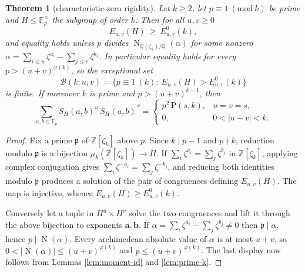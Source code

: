\documentclass[11pt,reqno]{amsart}
\newtheorem{theorem}{Theorem}[section]
\theoremstyle{definition}
\DeclareMathOperator{\Nm}{N}
\newcommand{\FF}{\mathbb{F}}
\newcommand{\ZZ}{\mathbb{Z}}
\newcommand{\QQ}{\mathbb{Q}}
\begin{document}
\begin{theorem}[characteristic-zero rigidity]\label{thm:B}
Let $k\ge2$, let $p\equiv1\ (\mathrm{mod}\ k)$ be prime and $H\le\FF_p^\times$
the subgroup of order $k$. Then for all $u,v\ge0$
\[
  E_{u,v}(H)\ \ge\ E^0_{u,v}(k),
\]
and equality holds unless $p$ divides
$\Nm_{\QQ(\zeta_k)/\QQ}(\alpha)$ for some nonzero
$\alpha=\sum_{i\le u}\zeta^{a_i}-\sum_{j\le v}\zeta^{b_j}$. In particular
equality holds for every $p>(u+v)^{\varphi(k)}$, so the exceptional set
\[
  \mathcal B(k;u,v)=\{p\equiv1\ (k):\ E_{u,v}(H)>E^0_{u,v}(k)\}
\]
is finite. If moreover $k$ is prime and $p>(u+v)^{k-1}$, then
\begin{equation}\label{eq:exact-moments}
  \sum_{a,b\in\FF_p}S_H(a,b)^u\,\overline{S_H(a,b)}^{\,v}=
  \begin{cases}
    p^2\,\mathrm{P}(s,k), & u=v=s,\\[2pt]
    0, & 0<|u-v|<k .
  \end{cases}
\end{equation}
\end{theorem}

\begin{proof}
Fix a prime $\mathfrak p$ of $\ZZ[\zeta_k]$ above $p$. Since $k\mid p-1$ and
$p\nmid k$, reduction modulo $\mathfrak p$ is a bijection
$\mu_k(\ZZ[\zeta_k])\to H$. If $\sum_i\zeta^{a_i}=\sum_j\zeta^{b_j}$ in
$\ZZ[\zeta_k]$, applying complex conjugation gives
$\sum_i\zeta^{-a_i}=\sum_j\zeta^{-b_j}$, and reducing both identities modulo
$\mathfrak p$ produces a solution of the pair of congruences defining
$E_{u,v}(H)$. The map is injective, whence $E_{u,v}(H)\ge E^0_{u,v}(k)$.

Conversely let a tuple in $H^u\times H^v$ solve the two congruences and lift it
through the above bijection to exponents $\mathbf a,\mathbf b$. If
$\alpha=\sum_i\zeta^{a_i}-\sum_j\zeta^{b_j}\neq0$ then $\mathfrak p\mid\alpha$,
hence $p\mid\Nm(\alpha)$. Every archimedean absolute value of $\alpha$ is at most
$u+v$, so $0<|\Nm(\alpha)|\le(u+v)^{\varphi(k)}$ and $p\le(u+v)^{\varphi(k)}$.
The last display now follows from Lemmas \ref{lem:moment-id} and
\ref{lem:prime-k}.
\end{proof}
\end{document}
